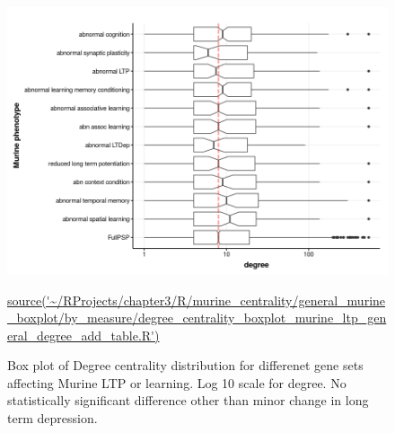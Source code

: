 \begin{figure}
    \centering
    \includegraphics[width=\textwidth]{images/chapter3/ggplot2/murine_centrality_boxplot/add_theme/addLTP/Rplot_murine_degree_ltp.png}
    \caption{Box plot of Degree centrality distribution for differenet gene sets affecting Murine LTP or learning. Log 10 scale for degree. No statistically significant difference other than minor change in long term depression.} 
    \tiny\url{source('~/RProjects/chapter3/R/murine_centrality/general_murine_boxplot/by_measure/degree_centrality_boxplot_murine_ltp_general_degree_add_table.R')}
    \label{fig:murine_ltp_centrality_boxplot_degree1}
\end{figure}


